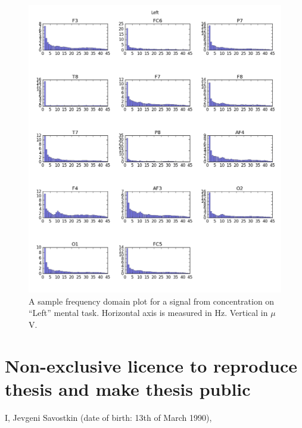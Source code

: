 \documentclass[12pt]{article}
\theoremstyle{definition}
\begin{document}
\section{}
\label{app:1}
\begin{figure} [H]
\begin{center}
\includegraphics[width=1\textwidth]{left_amplitudes}
\caption{A sample frequency domain plot for a signal from concentration on ``Left'' mental task. Horizontal axis is measured in Hz. Vertical in $\mu$V.}
\end{center}
\end{figure}

\pagebreak
\section*{\small Non-exclusive licence to reproduce thesis and make thesis public}


I, Jevgeni Savostkin (date of birth: 13th of March 1990),
\end{document}
